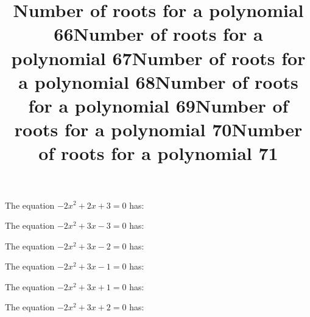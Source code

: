 \documentclass{article}
\begin{document}
\begin{category}
\begin{question}[multichoice]

\end{question}
\begin{question}[multichoice]
\title{Number of roots for a polynomial 66}
The equation $- 2 x^{2} + 2 x + 3=0$ has:


\end{question}
\begin{question}[multichoice]
\title{Number of roots for a polynomial 67}
The equation $- 2 x^{2} + 3 x - 3=0$ has:


\end{question}
\begin{question}[multichoice]
\title{Number of roots for a polynomial 68}
The equation $- 2 x^{2} + 3 x - 2=0$ has:


\end{question}
\begin{question}[multichoice]
\title{Number of roots for a polynomial 69}
The equation $- 2 x^{2} + 3 x - 1=0$ has:


\end{question}
\begin{question}[multichoice]
\title{Number of roots for a polynomial 70}
The equation $- 2 x^{2} + 3 x + 1=0$ has:


\end{question}
\begin{question}[multichoice]
\title{Number of roots for a polynomial 71}
The equation $- 2 x^{2} + 3 x + 2=0$ has:



\end{question}
\end{category}
\end{document}
